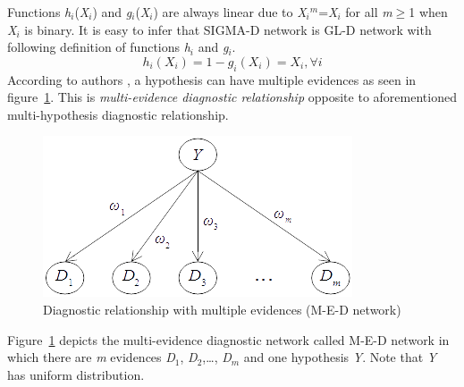 \documentclass{article}
\numberwithin{equation}{section}
\numberwithin{figure}{section}
\numberwithin{table}{section}
\begin{document}
\noindent Functions \textit{h${}_{i}$}(\textit{X${}_{i}$}) and \textit{g${}_{i}$}(\textit{X${}_{i}$}) are always linear due to \textit{X${}_{i}$${}^{m}$}=\textit{X${}_{i}$} for all \textit{m}$\mathrm{\ge}$1 when \textit{X${}_{i}$} is binary. It is easy to infer that SIGMA-D network is GL-D network with following definition of functions \textit{h${}_{i}$} and \textit{g${}_{i}$}.
\[h_i\left(X_i\right)=1-g_i\left(X_i\right)=X_i,\forall i\] 
According to authors \cite{millan:bayesiandiagnostic}, a hypothesis can have multiple evidences as seen in figure~\ref{figure:med-network}. This is \textit{multi-evidence diagnostic relationship} opposite to aforementioned multi-hypothesis diagnostic relationship.

\begin{figure}
\centering
\includegraphics{MEDNetwork.png}
\caption{Diagnostic relationship with multiple evidences (M-E-D network)}
\label{figure:med-network}
\end{figure}

Figure~\ref{figure:med-network} depicts the multi-evidence diagnostic network called M-E-D network in which there are \textit{m} evidences \textit{D}${}_{1}$, \textit{D}${}_{2}$,{\dots}, \textit{D${}_{m}$} and one hypothesis \textit{Y}. Note that \textit{Y} has uniform distribution.
\end{document}
